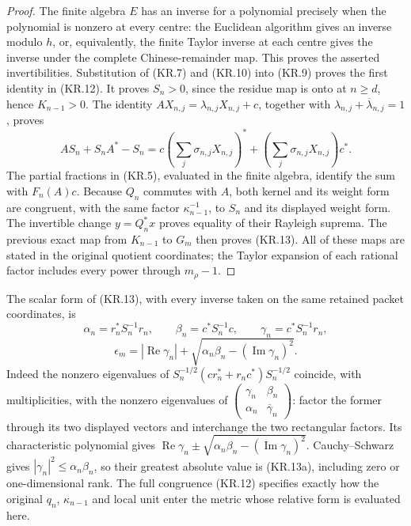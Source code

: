 \begin{proof}
The finite algebra \(E\) has an inverse for a polynomial precisely
when the polynomial is nonzero at every centre: the Euclidean
algorithm gives an inverse modulo \(h\), or, equivalently, the
finite Taylor inverse at each centre gives the inverse under the
complete Chinese-remainder map.  This proves the asserted
invertibilities.  Substitution of (KR.7) and (KR.10) into (KR.9)
proves the first identity in (KR.12).  It proves \(S_n>0\), since
the residue map is onto at \(n\geq d\), hence \(K_{n-1}>0\).
The identity
\(AX_{n,j}=\lambda_{n,j}X_{n,j}+c\), together with
\(\lambda_{n,j}+\overline\lambda_{n,j}=1\), proves
\[
 AS_n+S_nA^*-S_n
 =c\left(\sum_j\sigma_{n,j}X_{n,j}\right)^*
  +\left(\sum_j\sigma_{n,j}X_{n,j}\right)c^*.
\]
The partial fractions in (KR.5), evaluated in the finite algebra,
identify the sum with \(F_n(A)c\).
Because \(Q_n\) commutes with \(A\), both kernel and its weight
form are congruent, with the same factor \(\kappa_{n-1}^{-1}\),
to \(S_n\) and its displayed weight form.  The invertible change
\(y=Q_n^*x\) proves equality of their Rayleigh suprema.  The
previous exact map from \(K_{n-1}\) to \(G_m\) then proves
(KR.13).  All of these maps are stated in the original quotient
coordinates; the Taylor expansion of each rational factor includes
every power through \(m_\rho-1\).
\end{proof}

The scalar form of (KR.13), with every inverse taken on the same
retained packet coordinates, is
\[
 \alpha_n=r_n^*S_n^{-1}r_n,\qquad
 \beta_n=c^*S_n^{-1}c,\qquad
 \gamma_n=c^*S_n^{-1}r_n,
\]
\[
 \boxed{\epsilon_m=|\operatorname{Re}\gamma_n|
      +\sqrt{\alpha_n\beta_n-(\operatorname{Im}\gamma_n)^2}.}
                                                               \tag{KR.13a}
\]
Indeed the nonzero eigenvalues of
\(S_n^{-1/2}(cr_n^*+r_nc^*)S_n^{-1/2}\) coincide, with
multiplicities, with the nonzero eigenvalues of
\(\left(\begin{smallmatrix}\gamma_n&\beta_n\\
\alpha_n&\overline\gamma_n\end{smallmatrix}\right)\): factor
the former through its two displayed vectors and interchange the
two rectangular factors.  Its characteristic polynomial gives
\(\operatorname{Re}\gamma_n\pm
\sqrt{\alpha_n\beta_n-(\operatorname{Im}\gamma_n)^2}\).
Cauchy--Schwarz gives \(|\gamma_n|^2\leq\alpha_n\beta_n\),
so their greatest absolute value is (KR.13a), including zero or
one-dimensional rank.  The full congruence (KR.12) specifies
exactly how the original \(q_n\), \(\kappa_{n-1}\) and local
unit enter the metric whose relative form is evaluated here.

